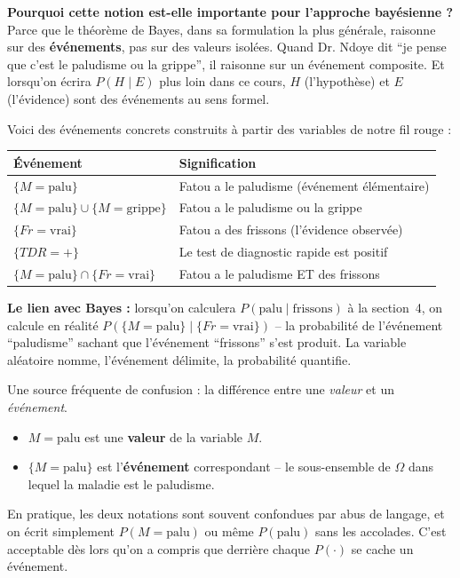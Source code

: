 \documentclass[11pt,a4paper]{article}
\begin{document}
\textbf{Pourquoi cette notion est-elle importante pour l'approche bayésienne ?} Parce que le théorème de Bayes, dans sa formulation la plus générale, raisonne sur des \textbf{événements}, pas sur des valeurs isolées. Quand Dr. Ndoye dit ``je pense que c'est le paludisme ou la grippe'', il raisonne sur un événement composite. Et lorsqu'on écrira $P(H \mid E)$ plus loin dans ce cours, $H$ (l'hypothèse) et $E$ (l'évidence) sont des événements au sens formel.

\begin{exemplebox}
Voici des événements concrets construits à partir des variables de notre fil rouge :

\begin{center}
\begin{tabular}{lp{8cm}}
\toprule
\textbf{Événement} & \textbf{Signification} \\
\midrule
$\{M = \text{palu}\}$ & Fatou a le paludisme (événement élémentaire) \\
$\{M = \text{palu}\} \cup \{M = \text{grippe}\}$ & Fatou a le paludisme ou la grippe \\
$\{Fr = \text{vrai}\}$ & Fatou a des frissons (l'évidence observée) \\
$\{TDR = +\}$ & Le test de diagnostic rapide est positif \\
$\{M = \text{palu}\} \cap \{Fr = \text{vrai}\}$ & Fatou a le paludisme ET des frissons \\
\bottomrule
\end{tabular}
\end{center}

\textbf{Le lien avec Bayes :} lorsqu'on calculera $P(\text{palu} \mid \text{frissons})$ à la section~4, on calcule en réalité $P(\{M = \text{palu}\} \mid \{Fr = \text{vrai}\})$ -- la probabilité de l'événement ``paludisme'' sachant que l'événement ``frissons'' s'est produit. La variable aléatoire nomme, l'événement délimite, la probabilité quantifie.
\end{exemplebox}

\begin{attentionbox}
Une source fréquente de confusion : la différence entre une \textit{valeur} et un \textit{événement}.
\begin{itemize}[nosep]
    \item $M = \text{palu}$ est une \textbf{valeur} de la variable $M$.
    \item $\{M = \text{palu}\}$ est l'\textbf{événement} correspondant -- le sous-ensemble de $\Omega$ dans lequel la maladie est le paludisme.
\end{itemize}
En pratique, les deux notations sont souvent confondues par abus de langage, et on écrit simplement $P(M = \text{palu})$ ou même $P(\text{palu})$ sans les accolades. C'est acceptable dès lors qu'on a compris que derrière chaque $P(\cdot)$ se cache un événement.
\end{attentionbox}
\end{document}
